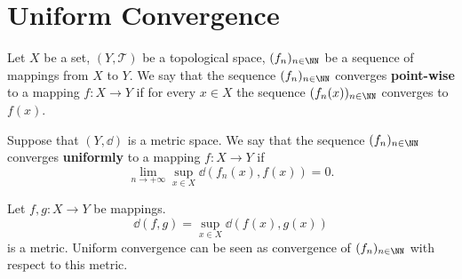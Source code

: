 \section{Uniform Convergence}
\begin{definitionenv}
    Let $X$ be a set, $(Y,\mathscr{T})$ be a topological space, $(f_n)_{n\in\NN}$ be a sequence of mappings from $X$ to $Y$. We say that the sequence $(f_n)_{n\in\NN}$ converges \textbf{point-wise} to a mapping $f:X\longrightarrow Y$ if for every $x\in X$ the sequence $(f_n(x))_{n\in\NN}$ converges to $f(x)$.

    \quad Suppose that $(Y,\dd)$ is a metric space. We say that the sequence $(f_n)_{n\in\NN}$ converges \textbf{uniformly} to a mapping $f:X\longrightarrow Y$ if
    $$ \lim_{n\rightarrow +\infty} \sup_{x\in X} \dd(f_n(x),f(x))=0.$$
\end{definitionenv}
\begin{remark}
    Let $f,g: X\longrightarrow Y$ be mappings. 
    $$ \dd(f,g)=\sup_{x\in X}\dd(f(x),g(x))$$
    is a metric. Uniform convergence can be seen as convergence of $(f_n)_{n\in\NN}$ with respect to this metric.
\end{remark}

